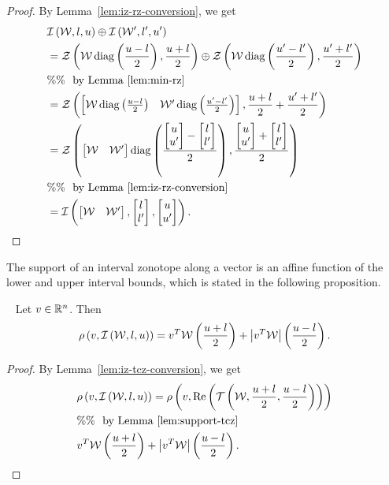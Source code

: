 %
\begin{proof}
By Lemma~\ref{lem:iz-rz-conversion}, we get
%
\begin{align*}
  &
  \mathit{\operatorname{\mathcal{I}}}\left(\mathcal{W},l,u\right)\oplus \mathit{\operatorname{\mathcal{I}}}\left(\mathcal{W}^\prime,l^\prime,u^\prime\right)\\
  & =
  \mathit{\mathcal{Z}}\left(\mathcal{W}\operatorname{diag}\left(\frac{u-l}{2}\right),\frac{u+l}{2}\right)\oplus \mathit{\mathcal{Z}}\left(\mathcal{W}\operatorname{diag}\left(\frac{u^\prime-l^\prime}{2}\right),\frac{u^\prime+l^\prime}{2}\right)\\
  & \%\%~~\text{by Lemma~\ref{lem:min-rz}}\\
  &= \mathit{\mathcal{Z}}\left(\left[\begin{matrix}\mathcal{W}\operatorname{diag}\left(\frac{u-l}{2}\right) &
      \mathcal{W}^\prime\operatorname{diag}\left(\frac{u^\prime-l^\prime}{2}\right)\end{matrix}\right],\frac{u+l}{2}+\frac{u^\prime+l^\prime}{2}\right)\\
  & = \mathit{\mathcal{Z}}\left(\left[\begin{matrix}
      \mathcal{W} & \mathcal{W}^\prime
      \end{matrix}\right]
    \operatorname{diag}\left(
      \frac{
        \left[\begin{matrix}
u\\u^\prime
          \end{matrix}\right]-\left[\begin{matrix}
l\\l^\prime
          \end{matrix}\right]
      }{2}
    \right)
    ,\frac{
        \left[\begin{matrix}
u\\u^\prime
          \end{matrix}\right]+\left[\begin{matrix}
l\\l^\prime
          \end{matrix}\right]
    }{2}\right)\\
  & \%\%~~\text{by Lemma~\ref{lem:iz-rz-conversion}}\\
  & = \mathit{\operatorname{\mathcal{I}}}\left(\left[\begin{matrix}\mathcal{W} &
    \mathcal{W}^\prime\end{matrix}\right],\left[\begin{matrix}l\\l^\prime\end{matrix}\right],\left[\begin{matrix}u\\u^\prime\end{matrix}\right]\right).~\hspace{8em}\qedhere
\end{align*}
\end{proof}
%
The support of an interval zonotope along a vector is an affine
function of the lower and upper interval bounds, which is stated in
the following proposition.
%
\begin{lemma}~\label{lem:support-iz}
Let $v\in\mathbb{R}^n$.  Then
%
\[
\rho\left(v,\mathit{\operatorname{\mathcal{I}}}\left(\mathcal{W},l,u\right)\right)=v^T\mathcal{W}\left(\frac{u+l}{2}\right)+\left|v^T\mathcal{W}\right|\left({\frac{u-l}{2}}\right).
\]
%
\end{lemma}
%
\begin{proof}
By Lemma~\ref{lem:iz-tcz-conversion}, we get
%
\begin{align*}
  & \rho\left(v,\mathit{\operatorname{\mathcal{I}}}\left(\mathcal{W},l,u\right)\right) = \rho\left(v,\operatorname{Re}\left(\mathit{\operatorname{\mathcal{T}}}\left(\mathcal{W},\frac{u+l}{2},{\frac{u-l}{2}}\right)\right)\right)\\
  & \%\%~~\text{by Lemma~\ref{lem:support-tcz}}\\
  & v^T\mathcal{W}\left(\frac{u+l}{2}\right)+\left|v^T\mathcal{W}\right|\left({\frac{u-l}{2}}\right).~\hspace{8em}\qedhere
\end{align*}
%
\end{proof}
